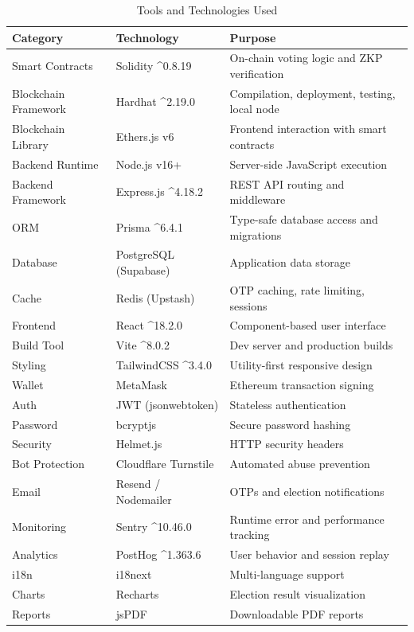 \documentclass[oneside,a4paper,12pt]{book}
\begin{document}
\begin{table}[htbp]
\centering
\renewcommand{\arraystretch}{1.2}
\small
\begin{tabularx}{\textwidth}{|p{3cm}|p{3.5cm}|X|}
\hline
\textbf{Category} & \textbf{Technology} & \textbf{Purpose} \\
\hline
Smart Contracts & Solidity \^{}0.8.19 & On-chain voting logic and ZKP verification \\
\hline
Blockchain Framework & Hardhat \^{}2.19.0 & Compilation, deployment, testing, local node \\
\hline
Blockchain Library & Ethers.js v6 & Frontend interaction with smart contracts \\
\hline
Backend Runtime & Node.js v16+ & Server-side JavaScript execution \\
\hline
Backend Framework & Express.js \^{}4.18.2 & REST API routing and middleware \\
\hline
ORM & Prisma \^{}6.4.1 & Type-safe database access and migrations \\
\hline
Database & PostgreSQL (Supabase) & Application data storage \\
\hline
Cache & Redis (Upstash) & OTP caching, rate limiting, sessions \\
\hline
Frontend & React \^{}18.2.0 & Component-based user interface \\
\hline
Build Tool & Vite \^{}8.0.2 & Dev server and production builds \\
\hline
Styling & TailwindCSS \^{}3.4.0 & Utility-first responsive design \\
\hline
Wallet & MetaMask & Ethereum transaction signing \\
\hline
Auth & JWT (jsonwebtoken) & Stateless authentication \\
\hline
Password & bcryptjs & Secure password hashing \\
\hline
Security & Helmet.js & HTTP security headers \\
\hline
Bot Protection & Cloudflare Turnstile & Automated abuse prevention \\
\hline
Email & Resend / Nodemailer & OTPs and election notifications \\
\hline
Monitoring & Sentry \^{}10.46.0 & Runtime error and performance tracking \\
\hline
Analytics & PostHog \^{}1.363.6 & User behavior and session replay \\
\hline
i18n & i18next & Multi-language support \\
\hline
Charts & Recharts & Election result visualization \\
\hline
Reports & jsPDF & Downloadable PDF reports \\
\hline
\end{tabularx}
\caption{Tools and Technologies Used}
\label{tab:tools}
\end{table}
\end{document}
